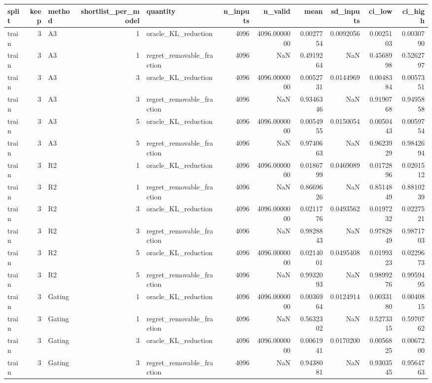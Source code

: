 \begin{tabular}{lrlrlrrrrrr}
\toprule
split & keep & method & shortlist_per_model & quantity & n_inputs & n_valid & mean & sd_inputs & ci_low & ci_high \\
\midrule
train & 3 & A3 & 1 & oracle_KL_reduction & 4096 & 4096.0000000 & 0.0027754 & 0.0092056 & 0.0025103 & 0.0030790 \\
train & 3 & A3 & 1 & regret_removable_fraction & 4096 & NaN & 0.4919264 & NaN & 0.4568998 & 0.5262797 \\
train & 3 & A3 & 3 & oracle_KL_reduction & 4096 & 4096.0000000 & 0.0052731 & 0.0144969 & 0.0048384 & 0.0057351 \\
train & 3 & A3 & 3 & regret_removable_fraction & 4096 & NaN & 0.9346346 & NaN & 0.9190768 & 0.9495858 \\
train & 3 & A3 & 5 & oracle_KL_reduction & 4096 & 4096.0000000 & 0.0054955 & 0.0150054 & 0.0050443 & 0.0059754 \\
train & 3 & A3 & 5 & regret_removable_fraction & 4096 & NaN & 0.9740663 & NaN & 0.9623929 & 0.9842694 \\
train & 3 & R2 & 1 & oracle_KL_reduction & 4096 & 4096.0000000 & 0.0186799 & 0.0469089 & 0.0172896 & 0.0201512 \\
train & 3 & R2 & 1 & regret_removable_fraction & 4096 & NaN & 0.8669626 & NaN & 0.8514849 & 0.8810239 \\
train & 3 & R2 & 3 & oracle_KL_reduction & 4096 & 4096.0000000 & 0.0211776 & 0.0493562 & 0.0197232 & 0.0227521 \\
train & 3 & R2 & 3 & regret_removable_fraction & 4096 & NaN & 0.9828843 & NaN & 0.9782849 & 0.9871703 \\
train & 3 & R2 & 5 & oracle_KL_reduction & 4096 & 4096.0000000 & 0.0214001 & 0.0495408 & 0.0199323 & 0.0229673 \\
train & 3 & R2 & 5 & regret_removable_fraction & 4096 & NaN & 0.9932093 & NaN & 0.9899276 & 0.9959495 \\
train & 3 & Gating & 1 & oracle_KL_reduction & 4096 & 4096.0000000 & 0.0036964 & 0.0124914 & 0.0033180 & 0.0040815 \\
train & 3 & Gating & 1 & regret_removable_fraction & 4096 & NaN & 0.5632302 & NaN & 0.5273315 & 0.5970762 \\
train & 3 & Gating & 3 & oracle_KL_reduction & 4096 & 4096.0000000 & 0.0061941 & 0.0170200 & 0.0056825 & 0.0067200 \\
train & 3 & Gating & 3 & regret_removable_fraction & 4096 & NaN & 0.9438081 & NaN & 0.9303545 & 0.9564763 \\

\end{tabular}
